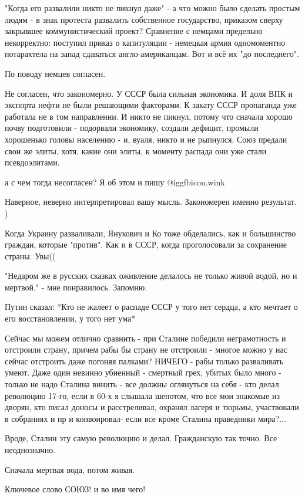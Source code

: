 \begin{itemize}

"Когда его развалили никто не пикнул даже" - а что можно было сделать простым
людям - в знак протеста развалить собственное государство, приказом сверху
закрывшее коммунистический проект? Сравнение с немцами предельно некорректно:
поступил приказ о капитуляции - немецкая армия одномоментно потарахтела на
запад сдаваться англо-американцам. Вот и всё их "до последнего".

\begin{itemize} %
По поводу немцев согласен.
\end{itemize} %


Не согласен, что закономерно. У СССР была сильная экономика. И доля ВПК и
экспорта нефти не были решающими факторами. К закату СССР пропаганда уже
работала не в том направлении. И никто не пикнул, потому что сначала хорошо
почву подготовили - подорвали экономику, создали дефицит, промыли хорошенько
головы населению - и, вуаля, никто и не рыпнулся. Союз предали свои же элиты,
хотя, какие они элиты, к моменту распада они уже стали псевдоэлитами.

\begin{itemize} %
а с чем тогда несогласен? Я об этом и пишу  @igg{fbicon.wink} 

Наверное, неверно интерпретировал вашу мысль. Закономерен именно результат. )
\end{itemize} %


Когда Украину разваливали, Янукович и Ко тоже обделались, как и большинство
граждан, которые "против". Как и в СССР, когда проголосовали за сохранение
страны. Увы((

"Недаром же в русских сказках оживление делалось не только живой водой, но и мертвой." - мне понравилось. Запомню.

Путин сказал: *Кто не жалеет о распаде СССР у того нет сердца, а кто мечтает о его восстановлении, у того нет ума*


Сейчас мы можем отлично сравнить - при Сталине победили неграмотность и
отстроили страну, причем рабы бы страну не отстроили - многое можно у нас
сейчас отстроить даже погоняя палками? НИЧЕГО - рабы только разваливать умеют.
Даже один невинно убиенный - смертный грех, убитых было много - только не надо
Сталина винить - все должны оглянуться на себя - кто делал революцию 17-го,
если в 60-х я слышала шепотом, что все мои знакомые из дворян, кто писал доносы
и расстреливал, охранял лагеря и тюрьмы, участвовали в собраниях и пр и
конвоировал- если все кроме Сталина праведники мира?...

\begin{itemize} %
Вроде, Сталин эту самую революцию и делал. Гражданскую так точно. Все неоднозначно.
\end{itemize} %

Сначала мертвая вода, потом живая.

Ключевое слово СОЮЗ! и во имя чего!

\end{itemize} %

